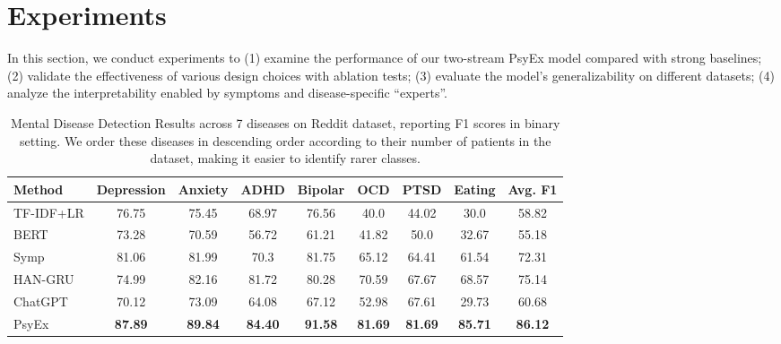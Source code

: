 \section{Experiments}
\label{sec:exp}

In this section, we conduct experiments to
(1) examine the performance of our two-stream PsyEx model compared with strong baselines; (2) validate the effectiveness of various design choices with ablation tests; (3) evaluate the model's generalizability on different datasets; 
(4) analyze the interpretability enabled by symptoms and disease-specific 
``experts''. 

\begin{table}[th]
    \small
    \centering
    \begin{tabular}{l|ccccccc|c}
    \hline
    Method & Depression & Anxiety & ADHD & Bipolar & OCD & PTSD & Eating & Avg. F1 \\ 
    \hline
    TF-IDF+LR \cite{cohan2018smhd} & 76.75	&75.45	&68.97	&76.56	&40.0	&44.02	&30.0 &	58.82 \\
    BERT \citep{nguyen2022improving} & 73.28&	70.59&	56.72&	61.21&	41.82&	50.0&	32.67 &	55.18 \\
    Symp \citep{Zhang2022SymptomIF} & 81.06 &	81.99&	70.3&	81.75&	65.12&	64.41&	61.54 &	72.31  \\
    HAN-GRU \citep{sekulic2019adapting}& 74.99&	82.16&	81.72&	80.28&	70.59&	67.67&	68.57&	75.14   \\
    ChatGPT & 70.12	&73.09	&64.08	&67.12	&52.98	&67.61	&29.73	&60.68  \\ 
    \hline
    PsyEx & \textbf{87.89}&    \textbf{89.84}&	\textbf{84.40}&	\textbf{91.58}&	\textbf{81.69} &	\textbf{81.69}&	\textbf{85.71}&	\textbf{86.12} \\ 
    \hline
    \end{tabular}
    \caption{Mental Disease Detection Results across 7 diseases on Reddit dataset, reporting F1 scores in binary setting. We order these diseases in descending order according to their number of patients in the dataset, making it easier to identify rarer classes.}
    \label{tab:disease}
\end{table}

